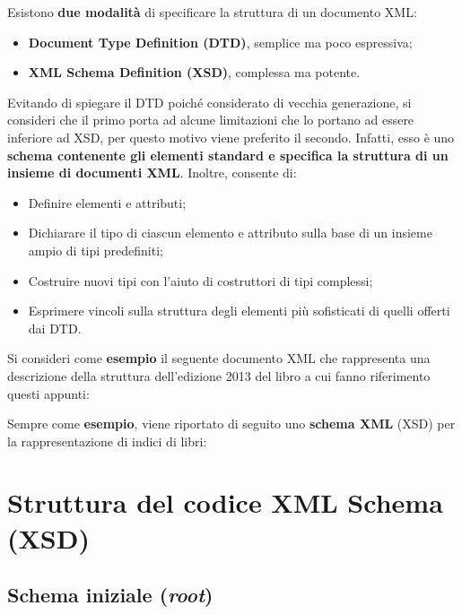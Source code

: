 \documentclass[a4paper]{article}
\begin{document}
	\noindent
	Esistono \textbf{due modalità} di specificare la struttura di un documento XML:
	\begin{itemize}
		\item \textcolor{Red3}{\textbf{Document Type Definition (DTD)}}, semplice ma poco espressiva;
		\item \textcolor{Red3}{\textbf{XML Schema Definition (XSD)}}, complessa ma potente.
	\end{itemize}
	Evitando di spiegare il DTD poiché considerato di vecchia generazione, si consideri che il primo porta ad alcune limitazioni che lo portano ad essere inferiore ad XSD, per questo motivo viene preferito il secondo. Infatti, esso è uno \textbf{schema contenente gli elementi standard e specifica la struttura di un insieme di documenti XML}. Inoltre, consente di:
	\begin{itemize}
		\item Definire elementi e attributi;
		
		\item Dichiarare il tipo di ciascun elemento e attributo sulla base di un insieme ampio di tipi predefiniti;
		
		\item Costruire nuovi tipi con l'aiuto di costruttori di tipi complessi;
		
		\item Esprimere vincoli sulla struttura degli elementi più sofisticati di quelli offerti dai DTD.
	\end{itemize}
	Si consideri come \textcolor{Green4}{\textbf{esempio}} il seguente documento XML che rappresenta una descrizione della struttura dell'edizione 2013 del libro a cui fanno riferimento questi appunti:
	
	Sempre come \textcolor{Green4}{\textbf{esempio}}, viene riportato di seguito uno \textbf{schema XML} (XSD) per la rappresentazione di indici di libri:
	\newpage
	
	\section{Struttura del codice XML Schema (XSD)}
	
	\subsection{Schema iniziale (\emph{root})}\label{par: Schema iniziale}
	
\end{document}
